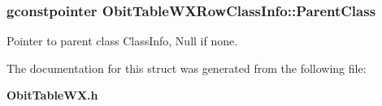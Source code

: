 \subsubsection{\setlength{\rightskip}{0pt plus 5cm}gconstpointer {\bf Obit\-Table\-WXRow\-Class\-Info::Parent\-Class}}\label{structObitTableWXRowClassInfo_o3}


Pointer to parent class Class\-Info, Null if none. 



The documentation for this struct was generated from the following file:\begin{CompactItemize}
\item 
{\bf Obit\-Table\-WX.h}\end{CompactItemize}
